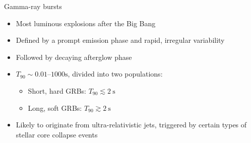 \begin{frame}{Gamma-ray bursts}
  \begin{itemize}
    \item Most luminous explosions after the Big Bang
    \item Defined by a prompt emission phase and rapid, irregular variability
    \item Followed by decaying afterglow phase
    \item $T_{90}\sim\numrange{0.01}{1000}\si{\second}$, divided into two populations:
    \begin{itemize}
      \item [\to] Short, hard GRBs: $T_{90} \lesssim \SI{2}{\second}$
      \item [\to] Long, soft GRBs:  $T_{90} \gtrsim \SI{2}{\second}$
    \end{itemize}
    \item Likely to originate from ultra-relativistic jets, triggered by certain types of stellar core collapse events
  \end{itemize}
\end{frame}

